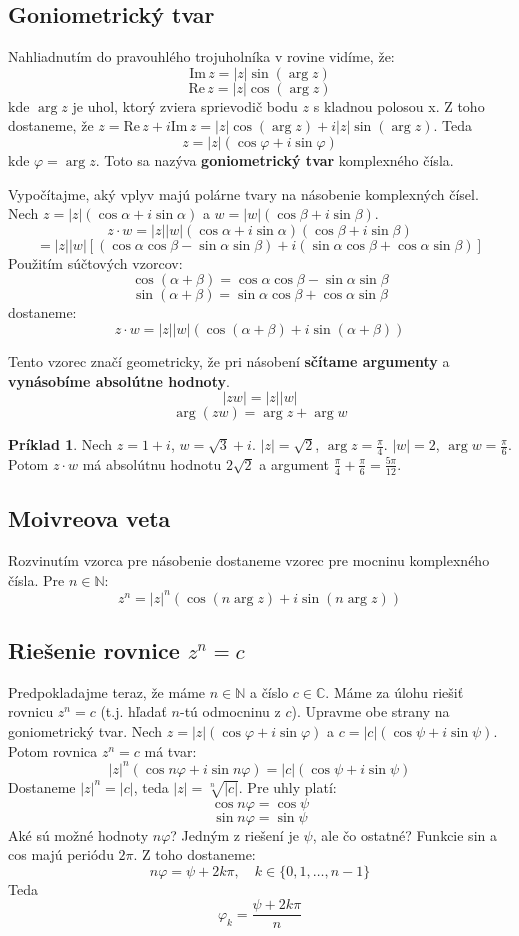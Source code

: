 \documentclass[11pt,a4paper]{article}
\theoremstyle{definition}
\newtheorem{priklad}[definicia]{Príklad}
\theoremstyle{plain}
\theoremstyle{remark}
\newcommand{\Nat}{\mathbb{N}}
\begin{document}
\subsection*{Goniometrický tvar}
Nahliadnutím do pravouhlého trojuholníka v rovine vidíme, že:
$$ \mathrm{Im}\, z = |z| \sin(\arg z) $$
$$ \mathrm{Re}\, z = |z| \cos(\arg z) $$
kde $\arg z$ je uhol, ktorý zviera sprievodič bodu $z$ s kladnou polosou x.
Z toho dostaneme, že $z = \mathrm{Re}\, z + i \mathrm{Im}\, z = |z|\cos(\arg z) + i|z|\sin(\arg z)$.
Teda
$$ z = |z|(\cos \varphi + i \sin \varphi) $$
kde $\varphi = \arg z$. Toto sa nazýva \textbf{goniometrický tvar} komplexného čísla.

Vypočítajme, aký vplyv majú polárne tvary na násobenie komplexných čísel. Nech $z = |z|(\cos \alpha + i \sin \alpha)$ a $w = |w|(\cos \beta + i \sin \beta)$.
$$ z \cdot w = |z||w| (\cos \alpha + i \sin \alpha)(\cos \beta + i \sin \beta) $$
$$ = |z||w| [ (\cos \alpha \cos \beta - \sin \alpha \sin \beta) + i (\sin \alpha \cos \beta + \cos \alpha \sin \beta) ] $$
Použitím súčtových vzorcov:
$$ \cos(\alpha+\beta) = \cos \alpha \cos \beta - \sin \alpha \sin \beta $$
$$ \sin(\alpha+\beta) = \sin \alpha \cos \beta + \cos \alpha \sin \beta $$
dostaneme:
$$ z \cdot w = |z||w| (\cos(\alpha+\beta) + i \sin(\alpha+\beta)) $$

Tento vzorec značí geometricky, že pri násobení \textbf{sčítame argumenty} a \textbf{vynásobíme absolútne hodnoty}.
$$ |zw| = |z||w| $$
$$ \arg(zw) = \arg z + \arg w $$

\begin{priklad}
Nech $z = 1+i$, $w = \sqrt{3}+i$.
$|z| = \sqrt{2}$, $\arg z = \frac{\pi}{4}$.
$|w| = 2$, $\arg w = \frac{\pi}{6}$.
Potom $z \cdot w$ má absolútnu hodnotu $2\sqrt{2}$ a argument $\frac{\pi}{4} + \frac{\pi}{6} = \frac{5\pi}{12}$.
\end{priklad}

\subsection*{Moivreova veta}
Rozvinutím vzorca pre násobenie dostaneme vzorec pre mocninu komplexného čísla. Pre $n \in \Nat$:
$$ z^n = |z|^n (\cos(n \arg z) + i \sin(n \arg z)) $$

\subsection*{Riešenie rovnice $z^n = c$}
Predpokladajme teraz, že máme $n \in \Nat$ a číslo $c \in \mathbb{C}$. Máme za úlohu riešiť rovnicu $z^n = c$ (t.j. hľadať $n$-tú odmocninu z $c$).
Upravme obe strany na goniometrický tvar. Nech $z = |z|(\cos \varphi + i \sin \varphi)$ a $c = |c|(\cos \psi + i \sin \psi)$.
Potom rovnica $z^n = c$ má tvar:
$$ |z|^n (\cos n\varphi + i \sin n\varphi) = |c|(\cos \psi + i \sin \psi) $$
Dostaneme $|z|^n = |c|$, teda $|z| = \sqrt[n]{|c|}$.
Pre uhly platí:
$$ \cos n\varphi = \cos \psi $$
$$ \sin n\varphi = \sin \psi $$
Aké sú možné hodnoty $n\varphi$?
Jedným z riešení je $\psi$, ale čo ostatné? Funkcie sin a cos majú periódu $2\pi$. Z toho dostaneme:
$$ n\varphi = \psi + 2k\pi, \quad k \in \{0, 1, \dots, n-1\} $$
Teda
$$ \varphi_k = \frac{\psi + 2k\pi}{n} $$
\end{document}
